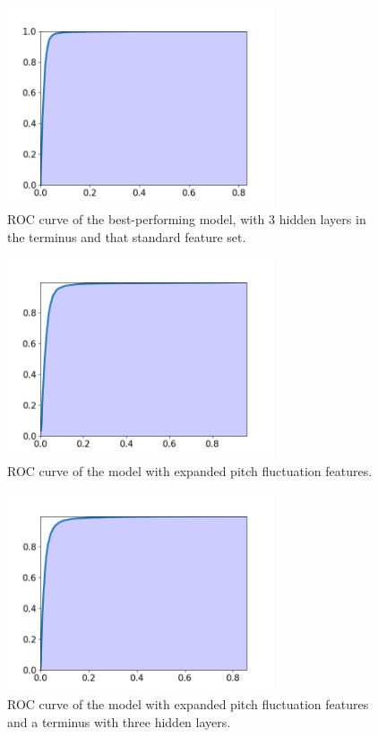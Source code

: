 \documentclass{article}
\begin{document}
		\begin{figure}[htbp]
			\centering
			\includegraphics[width=0.7\textwidth]{images/roc_cterm.png}
			\caption{ROC curve of the best-performing model, with 3 hidden layers in the terminus
			and that standard feature set.}
			\label{fig:roc_cterm}
		\end{figure}
		\begin{figure}[htbp]
			\centering
			\includegraphics[width=0.7\textwidth]{images/roc_mpf.png}
			\caption{ROC curve of the model with expanded pitch fluctuation features.}
			\label{fig:roc_mpf}
		\end{figure}
		\begin{figure}[htbp]
			\centering
			\includegraphics[width=0.7\textwidth]{images/roc_mpf_cterm.png}
			\caption{ROC curve of the model with expanded pitch fluctuation features and a
			terminus with three hidden layers.}
			\label{fig:roc_mpf_cterm}
		\end{figure}
\end{document}
